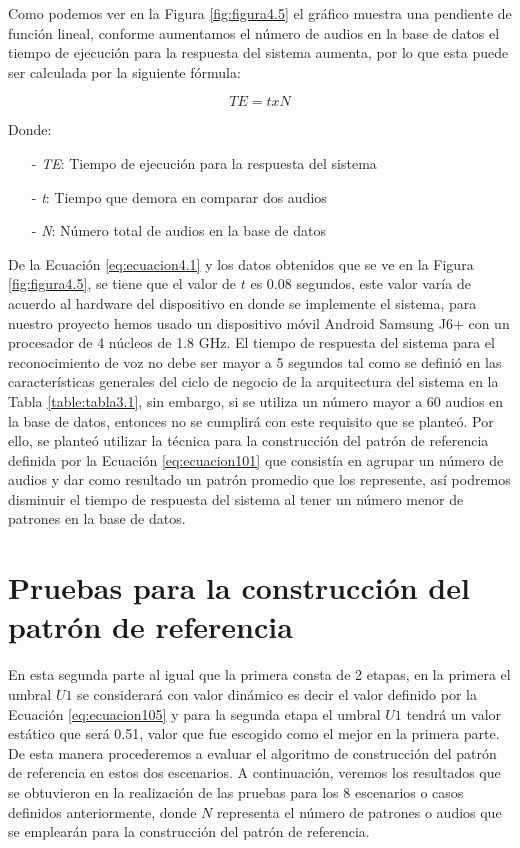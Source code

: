Como podemos ver en la Figura \ref{fig:figura4.5} el gráfico muestra una pendiente de función lineal, conforme aumentamos el número de audios en la base de datos el tiempo de ejecución para la respuesta del sistema aumenta, por lo que esta puede ser calculada por la siguiente fórmula:

\begin{equation}
\label{eq:ecuacion4.1}
TE = t x N
\end{equation}

Donde:
\begin{enumerate}
\item[-]\textit{TE}: Tiempo de ejecución para la respuesta del sistema
\item[-]\textit{t}: Tiempo que demora en comparar dos audios
\item[-]\textit{N}: Número total de audios en la base de datos
\end{enumerate}

\vskip 0.5cm
De la Ecuación \eqref{eq:ecuacion4.1} y los datos obtenidos que se ve en la Figura \ref{fig:figura4.5}, se tiene que el valor de $t$ es 0.08 segundos, este valor varía de acuerdo al hardware del dispositivo en donde se implemente el sistema, para nuestro proyecto hemos usado un dispositivo móvil Android Samsung J6+ con un procesador de 4 núcleos de 1.8 GHz.
\vskip 0.5cm
El tiempo de respuesta del sistema para el reconocimiento de voz no debe ser mayor a 5 segundos tal como se definió en las características generales del ciclo de negocio de la arquitectura del sistema en la Tabla \ref{table:tabla3.1}, sin embargo, si se utiliza un número mayor a 60 audios en la base de datos, entonces no se cumplirá con este requisito que se planteó.
\vskip 0.5cm
Por ello, se planteó utilizar la técnica para la construcción del patrón de referencia definida por la Ecuación \eqref{eq:ecuacion101} que consistía en agrupar un número de audios y dar como resultado un patrón promedio que los represente, así podremos disminuir el tiempo de respuesta del sistema al tener un número menor de patrones en la base de datos.

\section{Pruebas para la construcción del patrón de referencia}
En esta segunda parte al igual que la primera consta de 2 etapas, en la primera el umbral $U1$ se considerará con valor dinámico es decir el valor definido por la Ecuación \eqref{eq:ecuacion105} y para la segunda etapa el umbral $U1$ tendrá un valor estático que será 0.51, valor que fue escogido como el mejor en la primera parte. De esta manera procederemos a evaluar el algoritmo de construcción del patrón de referencia en estos dos escenarios.
\vskip 0.5cm
A continuación, veremos los resultados que se obtuvieron en la realización de las pruebas para los 8 escenarios o casos definidos anteriormente, donde $N$ representa el número de patrones o audios que se emplearán para la construcción del patrón de referencia.

